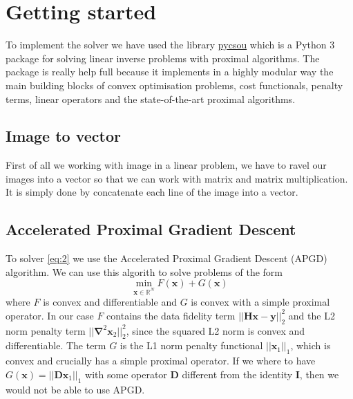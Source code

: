 \documentclass[a4paper,11pt,oneside]{report}
\theoremstyle{named}
\begin{document}
\section{Getting started}
To implement the solver we have used the library \href{https://github.com/matthieumeo/pycsou}{pycsou} \cite{matthieu_simeoni_2021_4715243} which is a Python 3 package for solving linear inverse problems with proximal algorithms. The package is really help full because it implements in a highly modular way the main building blocks of convex optimisation problems, cost functionals, penalty terms, linear operators and the state-of-the-art proximal algorithms.

\subsection{Image to vector}
First of all we working with image in a linear problem, we have to ravel our images into a vector so that we can work with matrix and matrix multiplication. It is simply done by concatenate each line of the image into a vector. 

\subsection{Accelerated Proximal Gradient Descent}
To solver \eqref{eq:2} we use the Accelerated Proximal Gradient Descent (APGD) algorithm. We can use this algorith to solve problems of the form
\begin{equation*}
    \min_{\boldsymbol{x} \in \mathbb{R}^N} F(\boldsymbol{x}) + G(\boldsymbol{x})
\end{equation*}
where $F$ is convex and differentiable and $G$ is convex with a simple proximal operator. In our case $F$ contains the data fidelity term $||\boldsymbol{H x} - \boldsymbol{y}||_2^2$ and the L2 norm penalty term $|| \boldsymbol{\nabla}^2 \boldsymbol{x}_2||_2^2$, since the squared L2 norm is convex and differentiable. The term $G$ is the L1 norm penalty functional $||\boldsymbol{x}_1||_1$, which is convex and crucially has a simple proximal operator. If we where to have $G(\boldsymbol{x}) = ||\boldsymbol{D x}_1||_1$ with some operator $\boldsymbol{D}$ different from the identity $\boldsymbol{I}$, then we would not be able to use APGD. 
\end{document}

